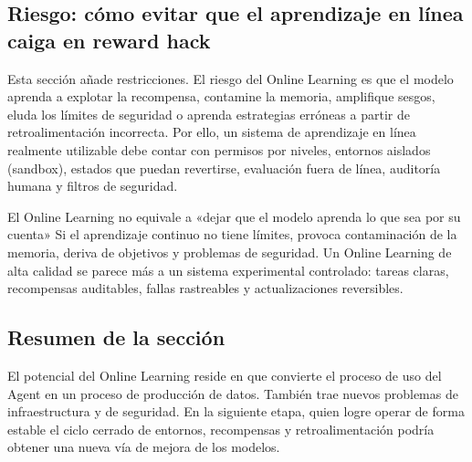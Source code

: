 \subsection{Riesgo: cómo evitar que el aprendizaje en línea caiga en reward hack}

Esta sección añade restricciones. El riesgo del Online Learning es que el modelo aprenda a explotar la recompensa, contamine la memoria, amplifique sesgos, eluda los límites de seguridad o aprenda estrategias erróneas a partir de retroalimentación incorrecta. Por ello, un sistema de aprendizaje en línea realmente utilizable debe contar con permisos por niveles, entornos aislados (sandbox), estados que puedan revertirse, evaluación fuera de línea, auditoría humana y filtros de seguridad.

\begin{warningbox}{El Online Learning no equivale a «dejar que el modelo aprenda lo que sea por su cuenta»}
Si el aprendizaje continuo no tiene límites, provoca contaminación de la memoria, deriva de objetivos y problemas de seguridad. Un Online Learning de alta calidad se parece más a un sistema experimental controlado: tareas claras, recompensas auditables, fallas rastreables y actualizaciones reversibles.
\end{warningbox}

\subsection{Resumen de la sección}

El potencial del Online Learning reside en que convierte el proceso de uso del Agent en un proceso de producción de datos. También trae nuevos problemas de infraestructura y de seguridad. En la siguiente etapa, quien logre operar de forma estable el ciclo cerrado de entornos, recompensas y retroalimentación podría obtener una nueva vía de mejora de los modelos.
